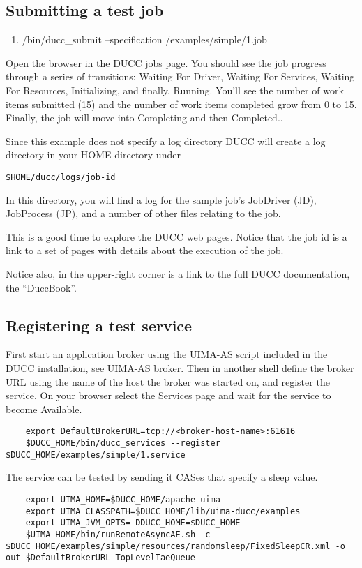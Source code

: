 \subsection{Submitting a test job}
  \begin{enumerate}
    \item \duccruntime/bin/ducc\_submit --specification \duccruntime/examples/simple/1.job
    \end{enumerate}
    
    Open the browser in the DUCC jobs page.  You should see the job progress through a series of
    transitions: Waiting For Driver, Waiting For Services, Waiting For Resources, Initializing, and
    finally, Running.  You'll see the number of work items submitted (15) and the number of work
    items completed grow from 0 to 15.  Finally, the job will move into Completing and then
    Completed..

    Since this example does not specify a log directory DUCC will create a log directory in your HOME directory under 
\begin{verbatim}
$HOME/ducc/logs/job-id
\end{verbatim}

    In this directory, you will find a log for the sample job's JobDriver (JD), JobProcess (JP), and
    a number of other files relating to the job.

    This is a good time to explore the DUCC web pages.  Notice that the job id is a link to a set of
    pages with details about the execution of the job.

    Notice also, in the upper-right corner is a link to the full DUCC documentation, the ``DuccBook''.

\subsection{Registering a test service}

    First start an application broker using the UIMA-AS script included in the DUCC installation,
    see \hyperref[sec:service.uima-as-broker]{UIMA-AS broker}.
    Then in another shell define the broker URL using the name of the host the broker was started
    on, and register the service. On your browser select the
    Services page and wait for the service to become Available.
    \begin{verbatim}
    export DefaultBrokerURL=tcp://<broker-host-name>:61616
    $DUCC_HOME/bin/ducc_services --register $DUCC_HOME/examples/simple/1.service
    \end{verbatim}
    The service can be tested by sending it CASes that specify a sleep value.
    \begin{verbatim}
    export UIMA_HOME=$DUCC_HOME/apache-uima
    export UIMA_CLASSPATH=$DUCC_HOME/lib/uima-ducc/examples
    export UIMA_JVM_OPTS=-DDUCC_HOME=$DUCC_HOME
    $UIMA_HOME/bin/runRemoteAsyncAE.sh -c $DUCC_HOME/examples/simple/resources/randomsleep/FixedSleepCR.xml -o out $DefaultBrokerURL TopLevelTaeQueue 
    \end{verbatim}

